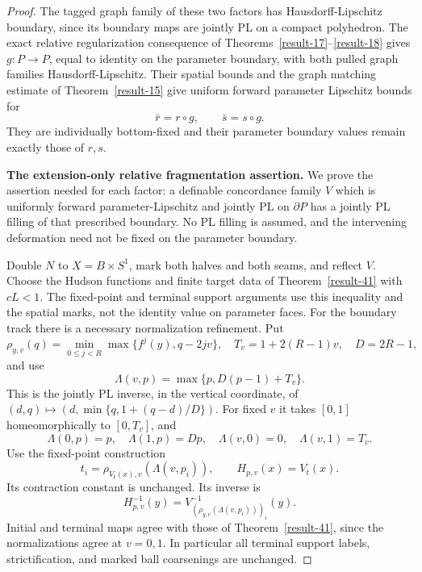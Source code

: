\documentclass[11pt,a4paper]{article}
\theoremstyle{definition}
\begin{document}
\begin{proof}
The tagged graph family of these two factors has
Hausdorff-Lipschitz boundary, since its boundary maps are
jointly PL on a compact polyhedron. The exact relative
regularization consequence of Theorems~\ref{result-17}--\ref{result-18} gives $g:P\to P$, equal to identity on
the parameter boundary, with both pulled graph families
Hausdorff-Lipschitz. Their spatial bounds and the graph
matching estimate of Theorem~\ref{result-15} give uniform forward parameter
Lipschitz bounds for
\begin{equation}
 \bar r=r\circ g,\qquad \bar s=s\circ g.
 \label{equation-100}
\end{equation}
They are individually bottom-fixed and their parameter
boundary values remain exactly those of $r,s$.

\textbf{The extension-only relative fragmentation assertion.}\quad
We prove the assertion needed for each factor: a definable
concordance family $V$ which is uniformly forward
parameter-Lipschitz and jointly PL on $\partial P$ has
a jointly PL filling of that prescribed boundary.
No PL filling is assumed, and the intervening deformation
need not be fixed on the parameter boundary.

Double $N$ to $X=B\times S^1$, mark both halves and both
seams, and reflect $V$. Choose the Hudson functions and
finite target data of Theorem~\ref{result-41} with $cL<1$. The fixed-point
and terminal support arguments use this inequality and
the spatial marks, not the identity value on parameter
faces. For the boundary track there is a necessary
normalization refinement. Put
\[
 \rho_{y,v}(q)=\min_{0\le j<R}\max\{f^j(y),q-2jv\},
 \quad T_v=1+2(R-1)v,\quad D=2R-1,
\]
and use
\begin{equation}
 \Lambda(v,p)=\max\{p,D(p-1)+T_v\}.
 \label{equation-101}
\end{equation}
This is the jointly PL inverse, in the vertical coordinate,
of $(d,q)\mapsto(d,\min\{q,1+(q-d)/D\})$.
For fixed $v$ it takes $[0,1]$ homeomorphically to
$[0,T_v]$, and
\[
 \Lambda(0,p)=p,\quad\Lambda(1,p)=Dp,\quad
 \Lambda(v,0)=0,\quad\Lambda(v,1)=T_v.
\]
Use the fixed-point construction
\begin{equation}
 t_i=\rho_{V_t(x),v}(\Lambda(v,p_i)),\qquad
 H_{p,v}(x)=V_t(x).
 \label{equation-102}
\end{equation}
Its contraction constant is unchanged. Its inverse is
\begin{equation}
 H_{p,v}^{-1}(y)=
 V^{-1}_{(\rho_{y,v}(\Lambda(v,p_i)))_i}(y).
 \label{equation-103}
\end{equation}
Initial and terminal maps agree with those of Theorem~\ref{result-41}, since
the normalizations agree at $v=0,1$. In particular all
terminal support labels, strictification, and marked ball
coarsenings are unchanged.


\end{proof}
\end{document}
